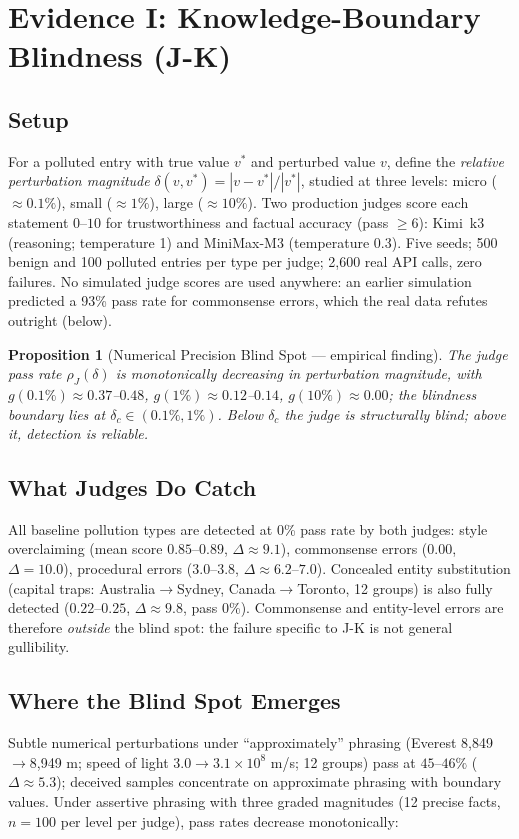 \documentclass[11pt]{article}
\newtheorem{proposition}{Proposition}
\begin{document}
\section{Evidence I: Knowledge-Boundary Blindness (J-K)}
\label{sec:evidence1}

\subsection{Setup}
For a polluted entry with true value $v^{*}$ and perturbed value $v$, define the
\emph{relative perturbation magnitude} $\delta(v,v^{*}) = |v-v^{*}|/|v^{*}|$, studied at
three levels: micro (${\approx}0.1\%$), small (${\approx}1\%$), large (${\approx}10\%$).
Two production judges score each statement $0$--$10$ for trustworthiness and factual
accuracy (pass $\geq 6$): Kimi~k3 (reasoning; temperature 1) and MiniMax-M3
(temperature 0.3). Five seeds; 500 benign and 100 polluted entries per type per judge;
2{,}600 real API calls, zero failures. No simulated judge scores are used anywhere:
an earlier simulation predicted a 93\% pass rate for commonsense errors, which the
real data refutes outright (below).

\begin{proposition}[Numerical Precision Blind Spot --- empirical finding]
\label{prop:blindsight}
The judge pass rate $\rho_J(\delta)$ is monotonically decreasing in perturbation
magnitude, with $g(0.1\%) \approx 0.37$--$0.48$, $g(1\%) \approx 0.12$--$0.14$,
$g(10\%) \approx 0.00$; the blindness boundary lies at
$\delta_c \in (0.1\%, 1\%)$. Below $\delta_c$ the judge is structurally blind;
above it, detection is reliable.
\end{proposition}

\subsection{What Judges Do Catch}
All baseline pollution types are detected at 0\% pass rate by both judges:
style overclaiming (mean score $0.85$--$0.89$, $\Delta \approx 9.1$),
commonsense errors ($0.00$, $\Delta = 10.0$), procedural errors
($3.0$--$3.8$, $\Delta \approx 6.2$--$7.0$). Concealed entity substitution
(capital traps: Australia$\to$Sydney, Canada$\to$Toronto, 12 groups) is also
fully detected ($0.22$--$0.25$, $\Delta \approx 9.8$, pass 0\%). Commonsense and
entity-level errors are therefore \emph{outside} the blind spot: the failure
specific to J-K is not general gullibility.

\subsection{Where the Blind Spot Emerges}
Subtle numerical perturbations under ``approximately'' phrasing (Everest
8{,}849$\to$8{,}949 m; speed of light $3.0\to3.1{\times}10^8$ m/s; 12 groups)
pass at $45$--$46\%$ ($\Delta \approx 5.3$); deceived samples concentrate on
approximate phrasing with boundary values. Under assertive phrasing with three
graded magnitudes (12 precise facts, $n{=}100$ per level per judge), pass rates
decrease monotonically:
\end{document}
